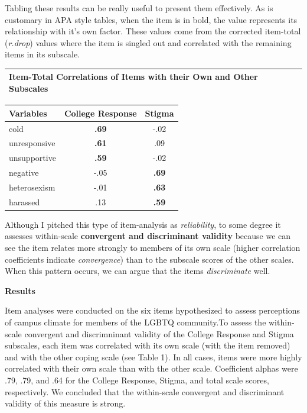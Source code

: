 \documentclass[
  english,
]{book}
\begin{document}
Tabling these results can be really useful to present them effectively. As is customary in APA style tables, when the item is in bold, the value represents its relationship with it's own factor. These values come from the corrected item-total (\emph{r.drop}) values where the item is singled out and correlated with the remaining items in its subscale.

\begin{longtable}[]{@{}l@{}}
\toprule
Item-Total Correlations of Items with their Own and Other Subscales \\
\midrule
\endhead
\bottomrule
\end{longtable}

\begin{longtable}[]{@{}lcc@{}}
\toprule
Variables & College Response & Stigma \\
\midrule
\endhead
cold & \textbf{.69} & -.02 \\
unresponsive & \textbf{.61} & .09 \\
unsupportive & \textbf{.59} & -.02 \\
negative & -.05 & \textbf{.69} \\
heterosexism & -.01 & \textbf{.63} \\
harassed & .13 & \textbf{.59} \\
\bottomrule
\end{longtable}

Although I pitched this type of item-analysis as \emph{reliability}, to some degree it assesses within-scale \textbf{convergent and discriminant validity} because we can see the item relates more strongly to members of its own scale (higher correlation coefficients indicate \emph{convergence}) than to the subscale scores of the other scales. When this pattern occurs, we can argue that the items \emph{discriminate} well.

\textbf{Results}

Item analyses were conducted on the six items hypothesized to assess perceptions of campus climate for members of the LGBTQ community.To assess the within-scale convergent and discrimninant validity of the College Response and Stigma subscales, each item was correlated with its own scale (with the item removed) and with the other coping scale (see Table 1). In all cases, items were more highly correlated with their own scale than with the other scale. Coefficient alphas were .79, .79, and .64 for the College Response, Stigma, and total scale scores, respectively. We concluded that the within-scale convergent and discriminant validity of this measure is strong.
\end{document}
